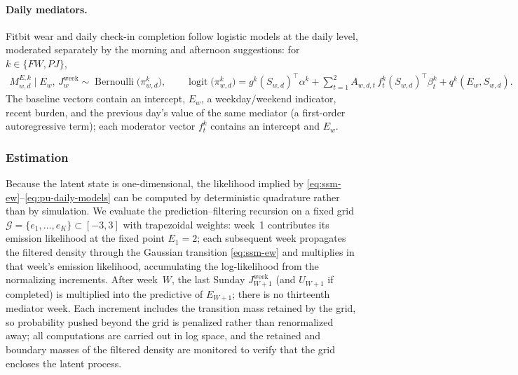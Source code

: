 \paragraph{Daily mediators.}
Fitbit wear and daily check-in completion follow logistic models at the daily
level, moderated separately by the morning and afternoon suggestions: for
$k \in \{FW, PJ\}$,
\begin{align}
M_{w,d}^{E,k} \mid E_w,\, J_w^{\mathrm{week}}
\sim
\operatorname{Bernoulli}\!\bigl(\pi_{w,d}^{k}\bigr),
\qquad
\operatorname{logit}\bigl(\pi_{w,d}^{k}\bigr)
=
g^{k}(S_{w,d})^\top \alpha^{k}
+ \sum_{t=1}^{2}
A_{w,d,t}\, f_t^{k}(S_{w,d})^\top \beta_t^{k}
+
q^{k}(E_w, S_{w,d}).
\label{eq:pu-daily-models}
\end{align}
The baseline vectors contain an intercept, $E_w$, a weekday/weekend indicator,
recent burden, and the previous day's value of the same mediator (a first-order
autoregressive term); each moderator vector $f_t^{k}$ contains an intercept and
$E_w$.

\subsubsection{Estimation}
\label{sssec:pu-estimation}

Because the latent state is one-dimensional, the likelihood implied by
\eqref{eq:ssm-ew}--\eqref{eq:pu-daily-models} can be computed by deterministic
quadrature rather than by simulation. We evaluate the prediction--filtering
recursion on a fixed grid $\mathcal{G} = \{e_1, \ldots, e_K\} \subset [-3, 3]$
with trapezoidal weights: week~1 contributes its emission likelihood at the
fixed point $E_1 = 2$; each subsequent week propagates the filtered density
through the Gaussian transition \eqref{eq:ssm-ew} and multiplies in that week's
emission likelihood, accumulating the log-likelihood from the normalizing
increments. After week~$W$, the last Sunday $J_{W+1}^{\mathrm{week}}$ (and
$U_{W+1}$ if completed) is multiplied into the predictive of $E_{W+1}$; there
is no thirteenth mediator week. Each increment includes the transition mass
retained by the grid,
so probability pushed beyond the grid is penalized rather than renormalized
away; all computations are carried out in log space, and the retained and
boundary masses of the filtered density are monitored to verify that the grid
encloses the latent process.


